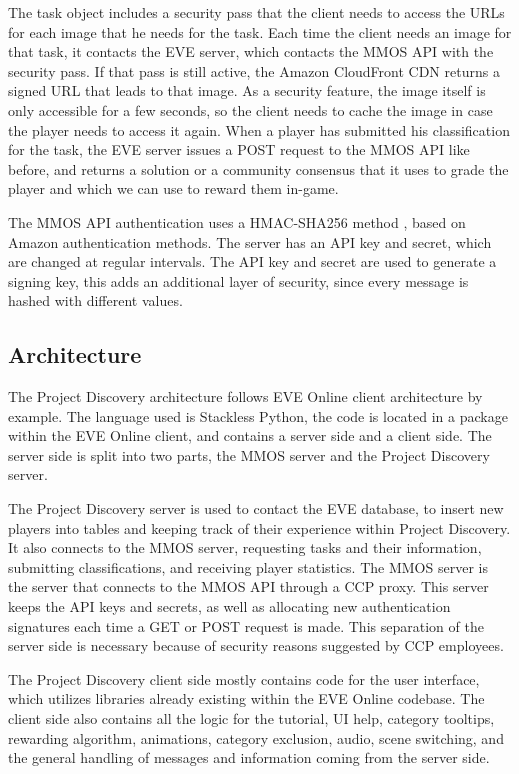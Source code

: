 	The task object includes a security pass that the client needs to access the URLs for each image that he needs for the task. Each time the client needs an image for that task, it contacts the EVE server, which contacts the MMOS API with the security pass. If that pass is still active, the Amazon CloudFront CDN returns a signed URL that leads to that image. As a security feature, the image itself is only accessible for a few seconds, so the client needs to cache the image in case the player needs to access it again. When a player has submitted his classification for the task, the EVE server issues a POST request to the MMOS API like before, and returns a solution or a community consensus that it uses to grade the player and which we can use to reward them in-game.

	The MMOS API authentication uses a HMAC-SHA256 method \cite{hmac}, based on Amazon authentication methods. The server has an API key and secret, which are changed at regular intervals. The API key and secret are used to generate a signing key, this adds an additional layer of security, since every message is hashed with different values.

\subsection{Architecture}
	The Project Discovery architecture follows EVE Online client architecture by example. The language used is Stackless Python, the code is located in a package within the EVE Online client, and contains a server side and a client side. The server side is split into two parts, the MMOS server and the Project Discovery server. 

	The Project Discovery server is used to contact the EVE database, to insert new players into tables and keeping track of their experience within Project Discovery. It also connects to the MMOS server, requesting tasks and their information, submitting classifications, and receiving player statistics. The MMOS server is the server that connects to the MMOS API through a CCP proxy. This server keeps the API keys and secrets, as well as allocating new authentication signatures each time a GET or POST request is made. This separation of the server side is necessary because of security reasons suggested by CCP employees.

	The Project Discovery client side mostly contains code for the user interface, which utilizes libraries already existing within the EVE Online codebase. The client side also contains all the logic for the tutorial, UI help, category tooltips, rewarding algorithm, animations, category exclusion, audio, scene switching, and the general handling of messages and information coming from the server side.

